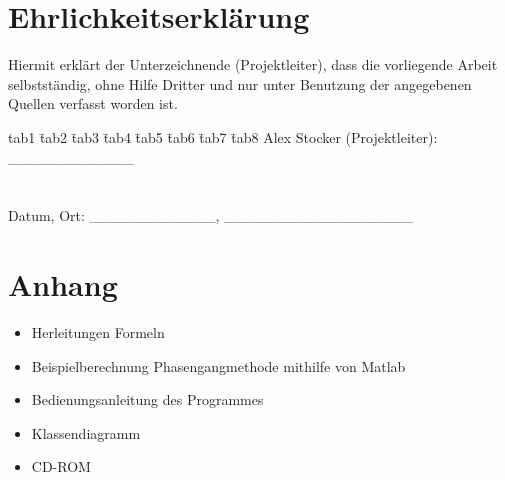 \documentclass{fhnwreport}
\begin{document}
\section{Ehrlichkeitserklärung}
Hiermit erklärt der Unterzeichnende (Projektleiter), dass die vorliegende Arbeit selbstständig, ohne Hilfe Dritter und nur unter Benutzung der angegebenen Quellen verfasst worden ist.\newline
\\

\begin{tabbing}
tab1 \= tab2 \= tab3 \= tab4 \= tab5 \=tab6 \= tab7 \= tab8 \kill
Alex Stocker (Projektleiter): \>\>\>\>\>\>\_\_\_\_\_\_\_\_\_\_\_\_\\
\\
\\
Datum, Ort: \>\>\>\>\>\>\_\_\_\_\_\_\_\_\_\_\_\_, \_\_\_\_\_\_\_\_\_\_\_\_\_\_\_\_\_\_\\
\end{tabbing}



\newpage



\newpage
\section{Anhang}
\begin{itemize}
\item Herleitungen Formeln
\item Beispielberechnung Phasengangmethode mithilfe von Matlab
\item Bedienungsanleitung des Programmes 
\item Klassendiagramm
\item CD-ROM

\end{itemize}


 
\end{document}

